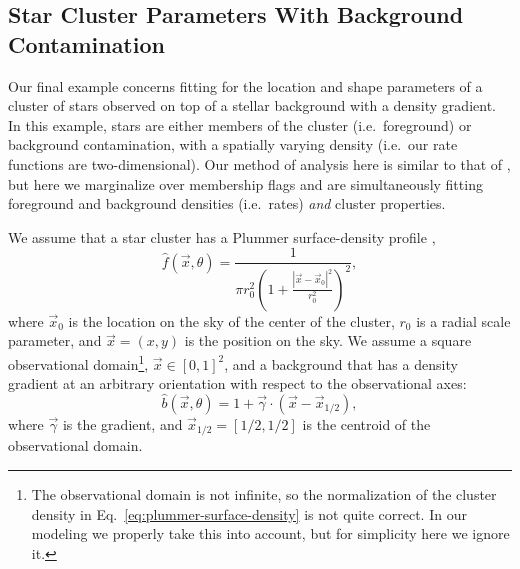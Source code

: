 \documentclass[aps,prd,reprint,nofootinbib]{revtex4-1}
\begin{document}
\subsection{Star Cluster Parameters With Background Contamination}
\label{sec:star-cluster}

Our final example concerns fitting for the location and shape
parameters of a cluster of stars observed on top of a stellar
background with a density gradient.  In this example, stars are either
members of the cluster (i.e.~foreground) or background contamination,
with a spatially varying density (i.e.~our rate functions are
two-dimensional).  Our method of analysis here is similar to that of
\citet{DeGennaro2009}, but here we marginalize over membership flags
and are simultaneously fitting foreground and background densities
(i.e.\ rates) \emph{and} cluster properties.  

We assume that a star cluster has a Plummer surface-density profile
\citep{Plummer1911,Aarseth1974},
\begin{equation}
  \label{eq:plummer-surface-density}
  \hat{f}(\vec{x}, \theta) = \frac{1}{\pi r_0^2 \left( 1 +
    \frac{\left| \vec{x} - \vec{x}_0 \right|^2}{r_0^2} \right)^2},
\end{equation}
where $\vec{x}_0$ is the location on the sky of the center of the
cluster, $r_0$ is a radial scale parameter, and $\vec{x} = \left( x, y
\right)$ is the position on the sky.  We assume a square observational
domain\footnote{The observational domain is not infinite, so the
  normalization of the cluster density in
  Eq.~\eqref{eq:plummer-surface-density} is not quite correct.  In our
  modeling we properly take this into account, but for simplicity here
  we ignore it.}, $\vec{x} \in [0,1]^2$, and a background that has a
density gradient at an arbitrary orientation with respect to the
observational axes:
\begin{equation}
  \hat{b}\left(\vec{x}, \theta\right) = 1 + \vec{\gamma} \cdot \left(
  \vec{x} - \vec{x}_{1/2} \right),
\end{equation}
where $\vec{\gamma}$ is the gradient, and $\vec{x}_{1/2} = [1/2, 1/2]$
is the centroid of the observational domain.  
\end{document}
